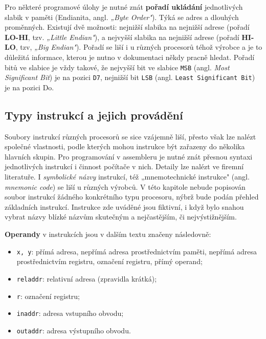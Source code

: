         Pro některé programové úlohy je nutné znát \textbf{pořadí ukládání} jednotlivých slabik v 
        paměti (Endianita, angl. \emph{„Byte Order"}). Týká se adres a dlouhých proměnných. 
        Existují dvě možnosti: nejnižší slabika na nejnižší adrese (pořadí \textbf{LO-HI}, tzv. 
        \emph{„Little Endian"}), a nejvyšší slabika na nejnižší adrese (pořadí \textbf{HI-LO}, tzv, 
        \emph{„Big Endian"}). Pořadí se liší i u různých procesorů téhož výrobce a je to důležitá 
        informace, kterou je nutno v dokumentaci někdy pracně hledat. Pořadí bitů ve slabice je 
        vždy takové, že nejvyšší bit ve slabice \texttt{MSB} (angl. \emph{Most Significant Bit}) je 
        na pozici \texttt{D7}, nejnižší bit \texttt{LSB} (angl. \texttt{Least Significant Bit}) je 
        na pozici Do.
        
    \subsection{Typy instrukcí a jejich provádění}\label{ces:IchapIVsecIIssecVI}
        Soubory instrukcí různých procesorů se sice vzájemně liší, přesto však lze nalézt společné 
        vlastnosti, podle kterých mohou instrukce být zařazeny do několika hlavních skupin. Pro 
        programování v assembleru je nutné znát přesnou syntaxi jednotlivých instrukcí i činnost 
        počítače v nich. Detaily lze nalézt ve firemní literatuře. I \emph{symbolické názvy} 
        instrukcí, též „mnemotechnické instrukce" (angl. \emph{mnemonic code}) se liší u různých 
        výrobců. V této kapitole nebude popisován soubor instrukcí žádného konkrétního typu 
        procesoru, nýbrž bude podán přehled základních instrukcí. Instrukce zde uváděné jsou 
        fiktivní, i když bylo snahou vybrat názvy blízké názvům skutečným a nejčastějším, či 
        nejvýstižnějším.
        
        \textbf{Operandy} v instrukcích jsou v dalším textu značeny následovně:
        \begin{itemize}\addtolength{\itemsep}{-0.5\baselineskip}
          \item \texttt{x, y}: přímá adresa, nepřímá adresa prostřednictvím paměti, nepřímá  
                adresa prostřednictvím registru, označení registru, přímý operand;
          \item \texttt{reladdr}: relativní adresa (zpravidla krátká);
          \item \texttt{r}: označení registru;
          \item \texttt{inaddr}: adresa vstupního obvodu;
          \item \texttt{outaddr}: adresa výstupního obvodu.          
        \end{itemize}
        
